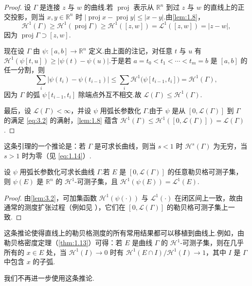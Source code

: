 \begin{proof}
设 $\Gamma$ 是连接 $z$ 与 $w$ 的曲线.若 $\operatorname{proj}$ 表示从 $\mathbb{R}^n$ 到过 $z$ 与 $w$ 的直线上的正交投影，则当 $x,y\in\mathbb{R}^n$ 时 $|\operatorname{proj}x-\operatorname{proj}y|\leq|x-y|$.由\cref{lem:1.8}，
\[
  \mathcal{H}^1(\Gamma)\geq\mathcal{H}^1(\operatorname{proj}\Gamma)\geq\mathcal{H}^1([z,w])=\mathscr{L}^1([z,w])=|z-w|,
\]
因为 $\operatorname{proj}\Gamma\supset[z,w]$.

现在设 $\Gamma$ 由 $\psi:[a,b]\to\mathbb{R}^n$ 定义.由上面的注记，对任意 $t$ 与 $u$ 有 $\mathcal{H}^1(\psi[t,u])\geq|\psi(t)-\psi(u)|$.于是若 $a=t_0<t_1<\cdots<t_m=b$ 是 $[a,b]$ 的任一分割，则
\[
  \sum_{i}|\psi(t_i)-\psi(t_{i-1})|\leq\sum_{i}\mathcal{H}^1\bigl(\psi[t_{i-1},t_i]\bigr)=\mathcal{H}^1(\Gamma),
\]
因为 $\Gamma$ 的弧 $\psi[t_{i-1},t_i]$ 除端点外互不相交.故 $\mathscr{L}(\Gamma)\leq\mathcal{H}^1(\Gamma)$.

最后，设 $\mathscr{L}(\Gamma)<\infty$，并设 $\psi$ 用弧长参数化 $\Gamma$.由于 $\psi$ 是从 $[0,\mathscr{L}(\Gamma)]$ 到 $\Gamma$ 的满足 \eqref{eq:3.2} 的满射，\cref{lem:1.8} 蕴含
$\mathcal{H}^1(\Gamma)\leq\mathcal{H}^1([0,\mathscr{L}(\Gamma)])=\mathscr{L}(\Gamma)$.
\end{proof}

这条引理的一个推论是：若 $\Gamma$ 是可求长曲线，则当 $s<1$ 时 $\mathcal{H}^s(\Gamma)$ 为无穷，当 $s>1$ 时为零（见 \eqref{eq:1.14}）.

\begin{corollary}\label{cor:3.3}
设 $\psi$ 用弧长参数化可求长曲线 $\Gamma$.若 $E$ 是 $[0,\mathscr{L}(\Gamma)]$ 的任意勒贝格可测子集，则 $\psi(E)$ 是 $\mathbb{R}^n$ 的 $\mathcal{H}^1$-可测子集，且 $\mathcal{H}^1(\psi(E))=\mathscr{L}^1(E)$.
\end{corollary}

\begin{proof}
由\cref{lem:3.2}，可加集函数 $\mathcal{H}^1(\psi(\cdot))$ 与 $\mathscr{L}^1(\cdot)$ 在闭区间上一致，故由通常的测度扩张过程（例如见 \textcite{kingmantaylor1966}），它们在 $[0,\mathscr{L}(\Gamma)]$ 的勒贝格可测子集上一致.
\end{proof}

这条推论使得直线上的勒贝格测度的所有常用结果都可以移植到曲线上.例如，由勒贝格密度定理（\cref{thm:1.13}）可得：若 $E$ 是曲线 $\Gamma$ 的 $\mathcal{H}^1$-可测子集，则在几乎所有的 $x\in E$ 处，当 $\mathcal{H}^1(I)\to 0$ 时有 $\mathcal{H}^1(E\cap I)/\mathcal{H}^1(I)\to 1$，其中 $I$ 是 $\Gamma$ 中包含 $x$ 的子弧.

我们不再进一步使用这条推论.

